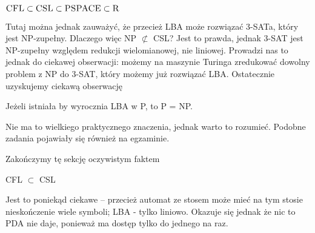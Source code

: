 \begin{corollary}
	\( \textsc{CFL} \subset \textsc{CSL} \subset \textsc{PSPACE} \subset \textsc{R} \)
\end{corollary}

Tutaj można jednak zauważyć, że przecież LBA może rozwiązać 3-SATa, który jest NP-zupełny. Dlaczego więc NP \( \not \subset \) CSL? Jest to prawda,
jednak 3-SAT jest NP-zupełny względem redukcji wielomianowej, nie liniowej. Prowadzi nas to jednak do ciekawej obserwacji: możemy na maszynie Turinga
zredukować dowolny problem z NP do 3-SAT, który możemy już rozwiązać LBA. Ostatecznie uzyskujemy ciekawą obserwację

\begin{corollary}
	Jeżeli istniała by wyrocznia LBA w P, to P = NP.
\end{corollary}

Nie ma to wielkiego praktycznego znaczenia, jednak warto to rozumieć. Podobne zadania pojawiały się również na egzaminie.

Zakończymy tę sekcję oczywistym faktem

\begin{lemma}
	CFL \(\subset\) CSL
\end{lemma}

Jest to poniekąd ciekawe -- przecież automat ze stosem może mieć na tym stosie nieskończenie wiele symboli; LBA - tylko liniowo. Okazuje się jednak że
nic to PDA nie daje, ponieważ ma dostęp tylko do jednego na raz.
